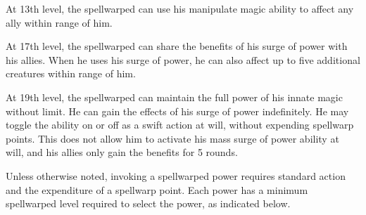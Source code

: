  At 13th level, the spellwarped can use his manipulate magic ability to affect any ally within \rngmed range of him.

 At 17th level, the spellwarped can share the benefits of his surge of power with his allies. When he uses his surge of power, he can also affect up to five additional creatures within \rngmed range of him.

 At 19th level, the spellwarped can maintain the full power of his innate magic without limit. He can gain the effects of his surge of power indefinitely. He may toggle the ability on or off as a swift action at will, without expending spellwarp points. This does not allow him to activate his mass surge of power ability at will, and his allies only gain the benefits for 5 rounds.

Unless otherwise noted, invoking a spellwarped power requires standard action and the expenditure of a spellwarp point. Each power has a minimum spellwarped level required to select the power, as indicated below.

